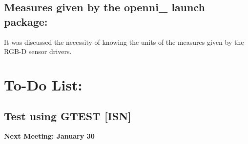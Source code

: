 \documentclass{article}
\newenvironment{myindentpar}[1]%
 {\begin{list}{}%
         {\setlength{\leftmargin}{#1}}%
         \item[]%
 }
 {\end{list}}
\begin{document}
	\subsection{ Measures given by the openni\_ launch package: 
}
		\begin{myindentpar}{1cm} 
It was discussed the necessity of knowing the units of the measures given by the RGB-D sensor drivers. 
		\end{myindentpar}





\section{\LARGE To-Do List: }
	\subsection{Test using GTEST [ISN]}
		\begin{myindentpar}{1cm} 

		\end{myindentpar}



\begin {center}
{\Large \textbf{Next Meeting: January 30 }}
\end{center}
\end{document}
